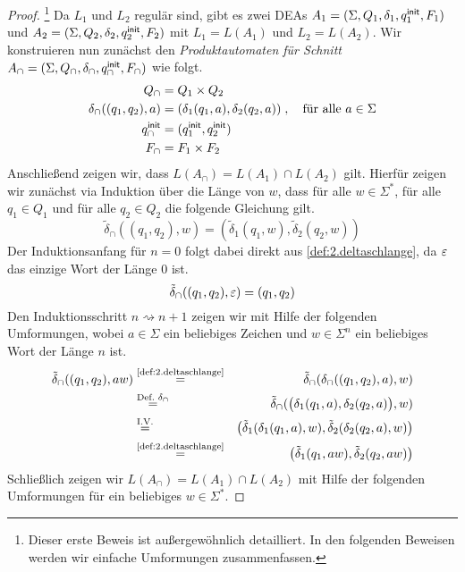 
\begin{proof}\footnote{Dieser erste Beweis ist außergewöhnlich detailliert. In den folgenden Beweisen werden wir einfache Umformungen zusammenfassen.}
Da $L_1$ und $L_2$ regulär sind, gibt es zwei \ac{DEA}s $A_1=(\Sigma, Q_1,\delta_1,q^\mathsf{init}_1,F_1)$ und $A_2=(\Sigma, Q_2,\delta_2,q^\mathsf{init}_2,F_2)$ mit $L_1=L(A_1)$ und $L_2=L(A_2)$.
Wir konstruieren nun zunächst den \emph{Produktautomaten für Schnitt} $A_\cap=(\Sigma, Q_\cap,\delta_\cap,q^\mathsf{init}_\cap,F_\cap)$ wie folgt.
		\begin{align*}
			Q_\cap &= Q_1\times Q_2\\
			\delta_\cap((q_1,q_2),a) &= (\delta_1(q_1,a),\delta_2(q_2,a))\;, \quad \text{für alle } a\in\Sigma\\
			q^\mathsf{init}_\cap &= (q^\mathsf{init}_1,q^\mathsf{init}_2)\\
			F_\cap &= F_1\times F_2\\
		\end{align*}
Anschließend zeigen wir, dass $L(A_\cap)=L(A_1)\cap L(A_2)$ gilt. 
Hierfür zeigen wir zunächst via Induktion über die Länge von $w$, dass für alle $w\in\Sigma^*$, für alle $q_1\in Q_1$ und für alle $q_2\in Q_2$ die folgende Gleichung gilt.
$$\tilde{\delta}_\cap((q_1,q_2),w) = (\tilde{\delta}_1(q_1,w), \tilde{\delta}_2(q_2,w))$$
Der Induktionsanfang für $n=0$ folgt dabei direkt aus \autoref{def:2.deltaschlange}, da $\varepsilon$ das einzige Wort der Länge $0$ ist.
$$\tilde{\delta}_\cap((q_1,q_2),\varepsilon) = (q_1,q_2)$$
Den Induktionsschritt $n\rightsquigarrow n+1$ zeigen wir mit Hilfe der folgenden Umformungen, wobei $a\in\Sigma$ ein beliebiges Zeichen und $w\in\Sigma^n$ ein beliebiges Wort der Länge $n$ ist.
\begin{eqnarray*}
  \tilde{\delta}_\cap((q_1,q_2),aw) 
    & \stackrel{\text{\autoref{def:2.deltaschlange}}}{=} & \tilde{\delta}_\cap(\delta_\cap((q_1,q_2),a),w)\\
    & \stackrel{\text{Def.\ }\delta_\cap}{=} & \tilde{\delta}_\cap (\big(\delta_1(q_1,a),\delta_2(q_2,a)\big),w)\\
    & \stackrel{\text{I.V.}}{=} & \big(\tilde{\delta}_1 (\delta_1(q_1,a),w), \tilde{\delta}_2(\delta_2(q_2,a),w)\big)\\
    & \stackrel{\text{\autoref{def:2.deltaschlange}}}{=} & \big(\tilde{\delta}_1(q_1,aw), \tilde{\delta}_2(q_2,aw)\big)
\end{eqnarray*}
Schließlich zeigen wir $L(A_\cap)=L(A_1)\cap L(A_2)$ mit Hilfe der folgenden Umformungen für ein beliebiges $w\in\Sigma^*$.

\end{proof}
